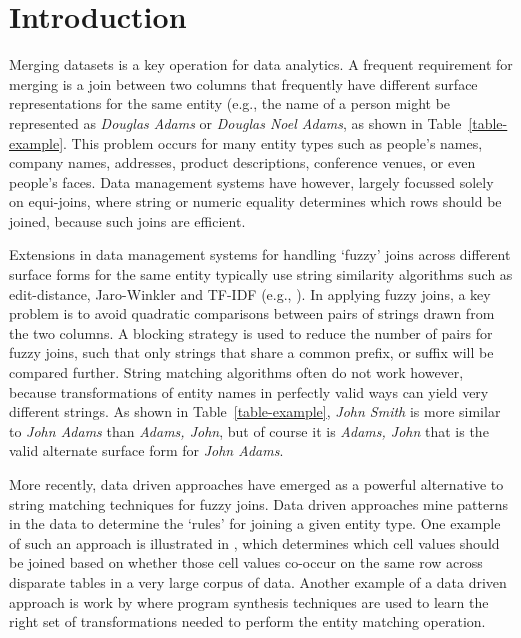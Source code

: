 \section{Introduction}

Merging datasets is a key operation for data analytics. A frequent requirement for merging is a join between two columns that frequently have different surface representations for the same entity (e.g., the name of a person might be represented as \textit{Douglas Adams} or \textit{Douglas Noel Adams}, as shown in Table~\ref{table-example}.  This problem occurs for many entity types such as people's names, company names, addresses, product descriptions, conference venues, or even people's faces.  Data management systems have however, largely focussed solely on equi-joins, where string or numeric equality determines which rows should be joined, because such joins are efficient.

Extensions in data management systems for handling `fuzzy' joins across different surface forms for the same entity typically use string similarity algorithms such as edit-distance, Jaro-Winkler and TF-IDF (e.g., \cite{Cohen2003}).  In applying fuzzy joins, a key problem is to avoid quadratic comparisons between pairs of strings drawn from the two columns.  A blocking strategy is used to reduce the number of pairs for fuzzy joins, such that only strings that share a common prefix, or suffix will be compared further.  String matching algorithms often do not work however, because transformations of entity names in perfectly valid ways can yield very different strings.  As shown in Table~\ref{table-example}, \textit{John Smith} is more similar to \textit{John Adams} than \textit{Adams, John}, but of course it is \textit{Adams, John} that is the valid alternate surface form for \textit{John Adams}.

More recently, data driven approaches have emerged as a powerful alternative to string matching techniques for fuzzy joins.  Data driven approaches mine patterns in the data to determine the `rules' for joining a given entity type.  One example of such an approach is illustrated in \cite{He:2015:SJS:2824032.2824036}, which determines which cell values should be joined based on whether those cell values co-occur on the same row across disparate tables in a very large corpus of data.  Another example of a data driven approach is work by \cite{auto-join-joining-tables-leveraging-transformations} where program synthesis techniques are used to learn the right set of transformations needed to perform the entity matching operation.  

